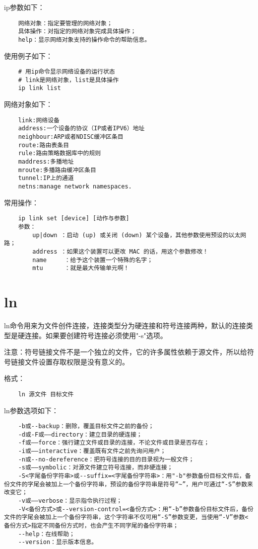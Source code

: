 \documentclass[a4paper,left=2.5cm,right=2.5cm,11pt]{article}
\begin{document}
	ip参数如下：
	\begin{lstlisting}
	网络对象：指定要管理的网络对象； 
	具体操作：对指定的网络对象完成具体操作； 
	help：显示网络对象支持的操作命令的帮助信息。
	\end{lstlisting}

	使用例子如下：
	\begin{lstlisting}
	# 用ip命令显示网络设备的运行状态
	# link是网络对象，list是具体操作
	ip link list
	\end{lstlisting}

	网络对象如下：
	\begin{lstlisting}
	link:网络设备
	address:一个设备的协议（IP或者IPV6）地址
	neighbour:ARP或者NDISC缓冲区条目
	route:路由表条目
	rule:路由策略数据库中的规则
	maddress:多播地址
	mroute:多播路由缓冲区条目
	tunnel:IP上的通道
	netns:manage network namespaces.
	\end{lstlisting}

	常用操作：
	\begin{lstlisting}
	ip link set [device] [动作与参数]
	参数：
		up|down ：启动 (up) 或关闭 (down) 某个设备，其他参数使用预设的以太网路；
		address ：如果这个装置可以更改 MAC 的话，用这个参数修改！
		name     ：给予这个装置一个特殊的名字；
		mtu      ：就是最大传输单元啊！
	\end{lstlisting}

\section{ln}
	ln命令用来为文件创件连接，连接类型分为硬连接和符号连接两种，默认的连接类型是硬连接。如果要创建符号连接必须使用"-s"选项。 \par
	注意：符号链接文件不是一个独立的文件，它的许多属性依赖于源文件，所以给符号链接文件设置存取权限是没有意义的。\par

	格式：
	\begin{lstlisting}
	ln 源文件 目标文件
	\end{lstlisting}

	ln参数选项如下：
	\begin{lstlisting}
	-b或--backup：删除，覆盖目标文件之前的备份； 
	-d或-F或——directory：建立目录的硬连接； 
	-f或——force：强行建立文件或目录的连接，不论文件或目录是否存在； 
	-i或——interactive：覆盖既有文件之前先询问用户； 
	-n或--no-dereference：把符号连接的目的目录视为一般文件； 
	-s或——symbolic：对源文件建立符号连接，而非硬连接； 
	-S<字尾备份字符串>或--suffix=<字尾备份字符串>：用"-b"参数备份目标文件后，备份文件的字尾会被加上一个备份字符串，预设的备份字符串是符号“~”，用户可通过“-S”参数来改变它； 
	-v或——verbose：显示指令执行过程； 
	-V<备份方式>或--version-control=<备份方式>：用“-b”参数备份目标文件后，备份文件的字尾会被加上一个备份字符串，这个字符串不仅可用“-S”参数变更，当使用“-V”参数<备份方式>指定不同备份方式时，也会产生不同字尾的备份字符串； 
	--help：在线帮助； 
	--version：显示版本信息。
	\end{lstlisting}
\end{document}
